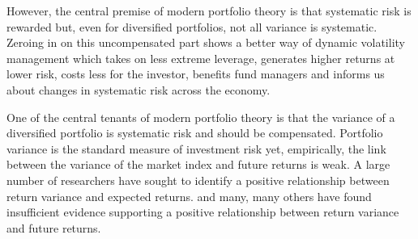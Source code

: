 However, the central premise of modern portfolio theory is that systematic risk is rewarded but, even for diversified portfolios, not all variance is systematic. Zeroing in on this uncompensated part shows a better way of dynamic volatility management which takes on less extreme leverage, generates higher returns at lower risk, costs less for the investor, benefits fund managers and informs us about changes in systematic risk across the economy. 

One of the central tenants of modern portfolio theory is that the variance of a diversified portfolio is systematic risk and should be compensated. \citep{markowitz_portfolio_1952} Portfolio variance is the standard measure of investment risk yet, empirically, the link between the variance of the market index and future returns is weak. A large number of researchers have sought to identify a positive relationship between return variance and expected returns. \citet{haugen_1972,FRENCH19873,glosten_1993,ang_cross-section_2006} and many, many others have found insufficient evidence supporting a positive relationship between return variance and future returns. 
